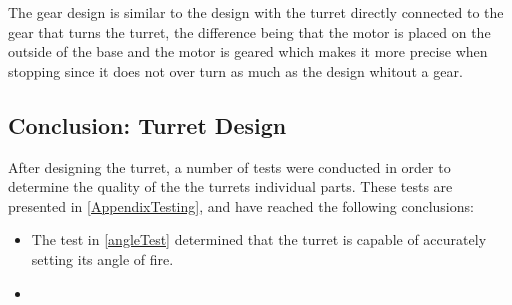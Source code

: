 The gear design is similar to the design with the turret directly connected to
the gear that turns the turret, the difference being that the motor is placed on
the outside of the base and the motor is geared which makes it more precise when
stopping since it does not over turn as much as the design whitout a gear.

\subsection{Conclusion: Turret Design}
After designing the turret, a number of tests were conducted in order to
determine the quality of the the turrets individual parts. These tests are
presented in \autoref{AppendixTesting}, and have reached the following
conclusions:\nl

\begin{itemize}
  \item The test in \autoref{angleTest} determined that the turret is capable of
  accurately setting its angle of fire.
  \item 
\end{itemize}
